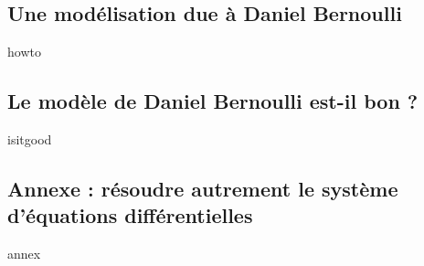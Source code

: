 \subsection{Une modélisation due à Daniel Bernoulli}

{howto}



\subsection{Le modèle de Daniel Bernoulli est-il bon ?}

{isitgood}



\subsection{Annexe : résoudre autrement le système d'équations différentielles}

{annex}
